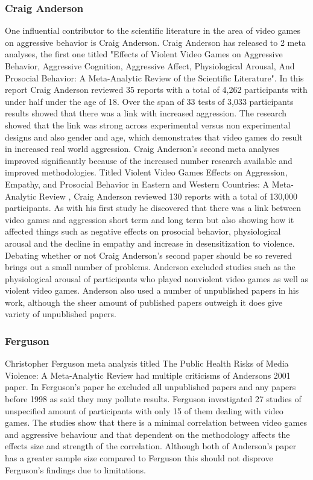 \documentclass[journal]{IEEEtran}
\begin{document}
   \subsubsection{Craig Anderson}
         One influential contributor to the scientific literature in the area of video games on aggressive behavior is Craig Anderson. Craig Anderson has released to 2 meta analyses, the first one titled "Effects of Violent Video Games on Aggressive Behavior, Aggressive Cognition, Aggressive Affect, Physiological Arousal, And Prosocial Behavior: A Meta-Analytic Review of the Scientific Literature"\cite{Craig2001}.  In this report Craig Anderson reviewed 35 reports with a total of 4,262 participants with under half under the age of 18. Over the span of 33 tests of 3,033 participants results showed that there was a link with increased aggression. The research showed that the link was strong across experimental versus non experimental designs and also gender and age, which demonstrates that video games do result in increased real world aggression. Craig Anderson's second meta analyses improved significantly because of the increased number research available and improved methodologies. Titled Violent Video Games Effects on Aggression, Empathy, and Prosocial Behavior in Eastern and Western Countries: A Meta-Analytic Review \cite{Craig2010}, Craig Anderson reviewed 130 reports with a total of 130,000 participants. As with his first study he discovered that there was a link between video games and aggression short term and long term but also showing how it affected things such as negative effects on prosocial behavior, physiological arousal and the decline in empathy and increase in desensitization to violence. Debating whether or not Craig Anderson's second paper should be so revered brings out a small number of problems. Anderson excluded studies such as the physiological arousal of participants who played nonviolent video games as well as violent video games. Anderson also used a number of unpublished papers in his work, although the sheer amount of published papers outweigh it does give variety of unpublished papers.
    
    \subsubsection{Ferguson}
        Christopher Ferguson meta analysis titled The Public Health Risks of Media Violence: A Meta-Analytic Review \cite{Ferguson} had multiple criticisms of Andersons 2001 paper. In Ferguson’s paper he excluded all unpublished papers and any papers before 1998 as said they may pollute results. Ferguson investigated 27 studies of unspecified amount of participants with only 15 of them dealing with video games. The studies show that there is a minimal correlation between video games and aggressive behaviour and that dependent on the methodology affects the effects size and strength of the correlation. Although both of Anderson’s paper has a greater sample size compared to Ferguson this should not disprove Ferguson’s findings due to limitations.
\end{document}
